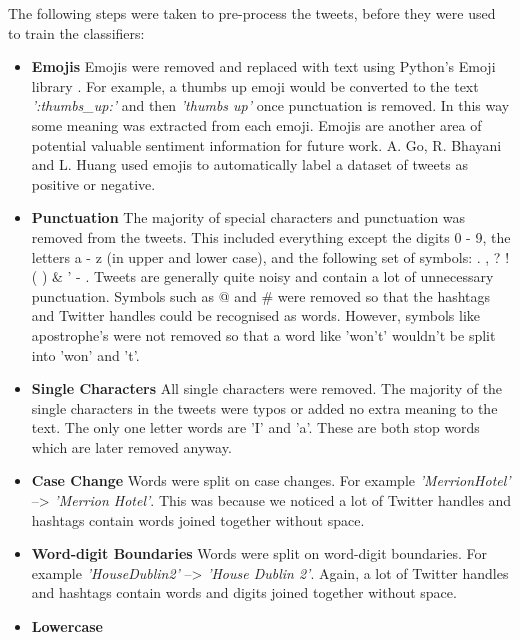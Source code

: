 The following steps were taken to pre-process the tweets, before they were used to train the classifiers:\newline
\begin{itemize}
    \item \textbf{Emojis}\newline
    Emojis were removed and replaced with text using Python's Emoji library \cite{emoji}. For example, a thumbs up emoji would be converted to the text \emph{':thumbs\_up:'} and then \emph{'thumbs up'} once punctuation is removed. In this way some meaning was extracted from each emoji. Emojis are another area of potential valuable sentiment information for future work. A. Go, R. Bhayani and L. Huang \cite{Go2009} used emojis to automatically label a dataset of tweets as positive or negative.
    \item \textbf{Punctuation}\newline
    The majority of special characters and punctuation was removed from the tweets. This included everything except the digits 0 - 9, the letters a - z (in upper and lower case), and the following set of symbols: . , ? ! ( ) \& ' - . Tweets are generally quite noisy and contain a lot of unnecessary punctuation. Symbols such as @ and \# were removed so that the hashtags and Twitter handles could be recognised as words. However, symbols like apostrophe's were not removed so that a word like 'won't' wouldn't be split into 'won' and 't'.
    \item \textbf{Single Characters}\newline
    All single characters were removed. The majority of the single characters in the tweets were typos or added no extra meaning to the text. The only one letter words are 'I' and 'a'. These are both stop words which are later removed anyway.
    \item \textbf{Case Change}\newline
    Words were split on case changes. For example \emph{'MerrionHotel'} --> \emph{'Merrion Hotel'}. This was because we noticed a lot of Twitter handles and hashtags contain words joined together without space. 
    \item \textbf{Word-digit Boundaries}\newline
    Words were split on word-digit boundaries. For example \emph{'HouseDublin2'} --> \emph{'House Dublin 2'}. Again, a lot of Twitter handles and hashtags contain words and digits joined together without space. 
    \item \textbf{Lowercase}\newline

\end{itemize}
